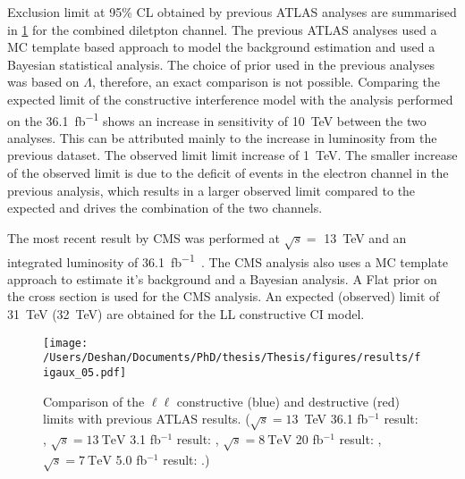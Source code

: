 Exclusion limit at 95\% CL obtained by previous ATLAS analyses are summarised in \cref{fig:limit_evol} for the combined diletpton channel. The previous ATLAS analyses used a MC template based approach to model the background estimation and used a Bayesian statistical analysis. The choice of prior used in the previous analyses was based on $\Lambda$, therefore, an exact comparison is not possible. Comparing the expected limit of the constructive interference model with the analysis performed on the \SI{36.1}{\femto\barn^{-1}} shows an increase in sensitivity of 
\SI{10}{\tera\electronvolt} between the two analyses. This can be attributed mainly to the increase in luminosity from the previous dataset. The observed limit limit increase of \SI{1}{\tera\electronvolt}. The smaller increase of the observed limit is due to the deficit of events in the electron channel in the previous analysis, which results in a larger observed limit compared to the expected and drives the combination of the two channels. 

The most recent result by CMS was performed at $\sqrt{s} = $ \SI{13}{\tera\electronvolt} and an integrated luminosity of \SI{36.1}{\femto\barn^{-1}}~\cite{Sirunyan:2018ipj}. The CMS analysis also uses a MC template approach to estimate it's background and a Bayesian analysis. A Flat prior on the cross section is used for the CMS analysis. An expected (observed) limit of \SI{31}{\tera\electronvolt} (\SI{32}{\tera\electronvolt}) are obtained for the LL constructive CI model. 

\begin{figure}[!htpb]
    \centering
    \texttt{[image: /Users/Deshan/Documents/PhD/thesis/Thesis/figures/results/figaux\_05.pdf]}
    \caption[Comparison of the $\ell\ell$ constructive (blue) and destructive (red) limits with previous ATLAS results.]{Comparison of the $\ell\ell$ constructive (blue) and destructive (red) limits with previous ATLAS results. ($\sqrt{s}=13$~TeV 36.1 fb$^{-1}$ result: \cite{EXOT-2016-05}, $\sqrt{s}=\SI{13}{\tera\electronvolt}$ 3.1 fb$^{-1}$ result: \cite{EXOT-2015-07}, $\sqrt{s}=\SI{8}{\tera\electronvolt}$ 20 fb$^{-1}$ result: \cite{EXOT-2013-19}, $\sqrt{s}=\SI{7}{\tera\electronvolt}$ 5.0 fb$^{-1}$ result: \cite{EXOT-2012-17}.)}
    \label{fig:limit_evol}
\end{figure}